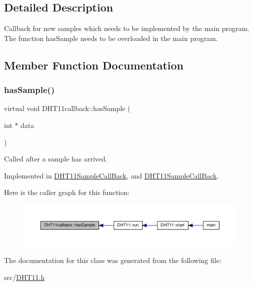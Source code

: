 \subsection{Detailed Description}
Callback for new samples which needs to be implemented by the main program. The function has\+Sample needs to be overloaded in the main program. 

\subsection{Member Function Documentation}
\mbox{\label{classDHT11callback_a57f4987fa9018acd572166a6c62b57d6}} 
\subsubsection{\texorpdfstring{has\+Sample()}{hasSample()}}
{\footnotesize\ttfamily virtual void D\+H\+T11callback\+::has\+Sample (\begin{DoxyParamCaption}\item[{int $\ast$}]{data }\end{DoxyParamCaption})\hspace{0.3cm}{\ttfamily [pure virtual]}}

Called after a sample has arrived. 

Implemented in \hyperlink{classDHT11SampleCallBack_a4545eba34196517369e67058f0e14e93}{D\+H\+T11\+Sample\+Call\+Back}, and \hyperlink{classDHT11SampleCallBack_a4545eba34196517369e67058f0e14e93}{D\+H\+T11\+Sample\+Call\+Back}.

Here is the caller graph for this function\+:
\nopagebreak
\begin{figure}[H]
\begin{center}
\leavevmode
\includegraphics[width=350pt]{classDHT11callback_a57f4987fa9018acd572166a6c62b57d6_icgraph}
\end{center}
\end{figure}


The documentation for this class was generated from the following file\+:\begin{DoxyCompactItemize}
\item 
src/\hyperlink{DHT11_8h}{D\+H\+T11.\+h}\end{DoxyCompactItemize}
